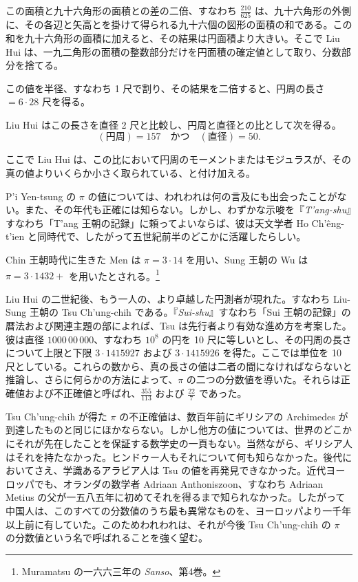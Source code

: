 \documentclass[11pt]{article}
\newcommand{\scanpage}[2]{\clearpage\setcounter{footnote}{0}\noindent{\footnotesize\color{gray}PDF #1 頁 · #2}\par\medskip}
\newcommand{\scanfooter}{}
\begin{document}
この面積と九十六角形の面積との差の二倍、すなわち $\frac{210}{625}$ は、九十六角形の外側に、その各辺と矢高とを掛けて得られる九十六個の図形の面積の和である。この和を九十六角形の面積に加えると、その結果は円面積より大きい。そこで Liu Hui は、一九二角形の面積の整数部分だけを円面積の確定値として取り、分数部分を捨てる。

この値を半径、すなわち 1 尺で割り、その結果を二倍すると、円周の長さ $=6\cdot28$ 尺を得る。

Liu Hui はこの長さを直径 2 尺と比較し、円周と直径との比として次を得る。
\[
(\text{円周})=157\quad\text{かつ}\quad(\text{直径})=50.
\]

ここで Liu Hui は、この比において円周のモーメントまたはモジュラスが、その真の値よりいくらか小さく取られている、と付け加える。

P'i Yen-tsung の $\pi$ の値については、われわれは何の言及にも出会ったことがない。また、その年代も正確には知らない。しかし、わずかな示唆を『\emph{T'ang-shu}』すなわち「T'ang 王朝の記録」に頼ってよいならば、彼は天文学者 Ho Ch'êng-t'ien と同時代で、したがって五世紀前半のどこかに活躍したらしい。

Chin 王朝時代に生きた Men は $\pi=3\cdot14$ を用い、Sung 王朝の Wu は $\pi=3\cdot1432+$ を用いたとされる。\footnote{Muramatsu の一六六三年の \emph{Sanso}、第4巻。}
\scanfooter

\scanpage{0064}{第7章、印刷頁50}
Liu Hui の二世紀後、もう一人の、より卓越した円測者が現れた。すなわち Liu-Sung 王朝の Tsu Ch'ung-chih である。『\emph{Sui-shu}』すなわち「Sui 王朝の記録」の暦法および関連主題の部によれば、Tsu は先行者より有効な進め方を考案した。彼は直径 $1000\,00\,000$、すなわち $10^8$ の円を 10 尺に等しいとし、その円周の長さについて上限と下限 $3\cdot1415927$ および $3\cdot1415926$ を得た。ここでは単位を 10 尺としている。これらの数から、真の長さの値は二者の間になければならないと推論し、さらに何らかの方法によって、$\pi$ の二つの分数値を導いた。それらは正確値および不正確値と呼ばれ、$\frac{355}{113}$ および $\frac{22}{7}$ であった。

Tsu Ch'ung-chih が得た $\pi$ の不正確値は、数百年前にギリシアの Archimedes が到達したものと同じにほかならない。しかし他方の値については、世界のどこかにそれが先在したことを保証する数学史の一頁もない。当然ながら、ギリシア人はそれを持たなかった。ヒンドゥー人もそれについて何も知らなかった。後代においてさえ、学識あるアラビア人は Tsu の値を再発見できなかった。近代ヨーロッパでも、オランダの数学者 Adriaan Anthoniszoon、すなわち Adriaan Metius の父が一五八五年に初めてそれを得るまで知られなかった。したがって中国人は、このすべての分数値のうち最も異常なものを、ヨーロッパより一千年以上前に有していた。このためわれわれは、それが今後 Tsu Ch'ung-chih の $\pi$ の分数値という名で呼ばれることを強く望む。
\end{document}

